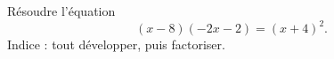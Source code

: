 
\begin{exercice}\cite{LVLruu}\label{exoPremiere-0042}

    Résoudre l'équation 
    \begin{equation}
        (x-8)(-2x-2)=(x+4)^2.
    \end{equation}
    Indice : tout développer, puis factoriser. 
 

\end{exercice}
